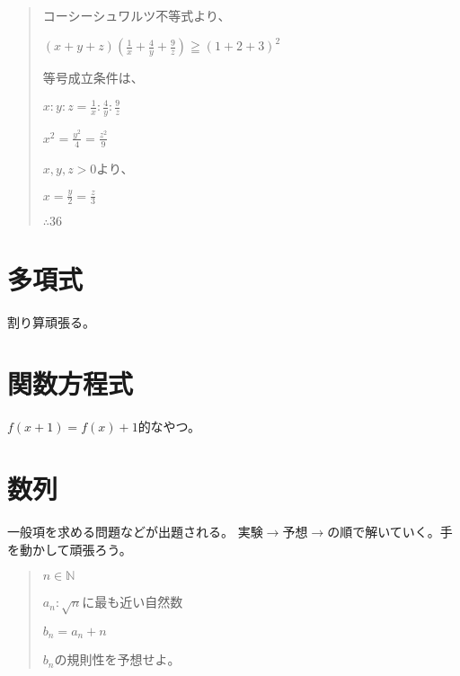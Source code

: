 \documentclass[uplatex,fleqn]{jsbook}
\begin{document}
\begin{quote}
    コーシーシュワルツ不等式より、

    $\displaystyle \left(x+y+z\right)\left(\frac{1}{x}+\frac{4}{y}+\frac{9}{z}\right)\geqq \left(1+2+3\right)^2$

    等号成立条件は、

    $\displaystyle x:y:z=\frac{1}{x}:\frac{4}{y}:\frac{9}{z}$

    $x^2=\frac{y^2}{4}=\frac{z^2}{9}$

    $x,y,z>0$より、

    $x=\frac{y}{2}=\frac{z}{3}$

    $\therefore 36$
\end{quote}

\section{多項式}
割り算頑張る。

\section{関数方程式}
$f\left(x+1\right)=f\left(x\right)+1$的なやつ。

\section{数列}
一般項を求める問題などが出題される。
実験$\rightarrow$予想$\rightarrow$の順で解いていく。手を動かして頑張ろう。

\begin{quote}
    $n\in \mathbb{N}$

    $a_n:\sqrt{n}$に最も近い自然数

    $b_n=a_n+n$

    $b_n$の規則性を予想せよ。
\end{quote}
\end{document}
